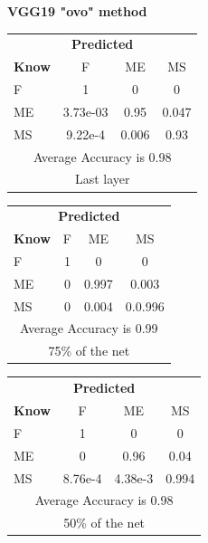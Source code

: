 \documentclass[12pt]{article} %
\begin{document}
\begin{center}
\textbf{ VGG19  "ovo" method}
\end{center}
\begin{minipage}{0.5\textwidth}
\begin{center}
\begin{tabular}{l|c|c|c|}
 \multicolumn{4}{c}{ \textbf{ Predicted}}\\
 \textbf{Know}&F&ME&MS\\ \hline\hline
F   &1&0&0\\
ME &3.73e-03&0.95&0.047\\
MS &9.22e-4&0.006&0.93\\
\multicolumn{4}{c}{Average Accuracy is 0.98}\\
\multicolumn{4}{c}{Last layer}\\
\end{tabular}
\end{center}
\end{minipage}
\begin{minipage}{0.5\textwidth}
\begin{center}
\begin{tabular}{l|c|c|c|}
 \multicolumn{4}{c}{ \textbf{ Predicted}}\\
 \textbf{Know}&F&ME&MS\\ \hline\hline
F   &1&0&0\\
ME &0&0.997&0.003\\
MS &0&0.004&0.0.996\\
\multicolumn{4}{c}{Average Accuracy is 0.99}\\
\multicolumn{4}{c}{75\%  of the net}\\
\end{tabular}
\end{center}
\end{minipage}
\begin{minipage}{0.5\textwidth}
\begin{center}
\begin{tabular}{l|c|c|c|}
 \multicolumn{4}{c}{ \textbf{ Predicted}}\\
 \textbf{Know}&F&ME&MS\\ \hline\hline
F   &1&0&0\\
ME &0&0.96&0.04\\
MS &8.76e-4&4.38e-3&0.994\\
\multicolumn{4}{c}{Average Accuracy is 0.98}\\
\multicolumn{4}{c}{50\%  of the net}\\
\end{tabular}
\end{center}
\end{minipage}
\end{document}

